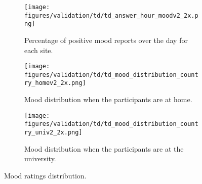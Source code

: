 \begin{figure}
    \centering
    \begin{subfigure}{0.31\textwidth}
        \texttt{[image: figures/validation/td/td\_answer\_hour\_moodv2\_2x.png]}
        \caption{Percentage of positive mood reports over the day for each site.}
        \label{fig:mood_location:hourdist}
    \end{subfigure}
    \hfill
    \begin{subfigure}{0.31\textwidth}
        \texttt{[image: figures/validation/td/td\_mood\_distribution\_country\_homev2\_2x.png]}
        \caption{Mood distribution when the participants are at home.}
        \label{fig:mood_location:home}
    \end{subfigure}
    \hfill
    \begin{subfigure}{0.31\textwidth}
        \texttt{[image: figures/validation/td/td\_mood\_distribution\_country\_univ2\_2x.png]}
        \caption{Mood distribution when the participants are at the university.}
        \label{fig:mood_location:uni}
    \end{subfigure}
    \caption{Mood ratings distribution.}
    \label{fig:mood_location}
\end{figure}

